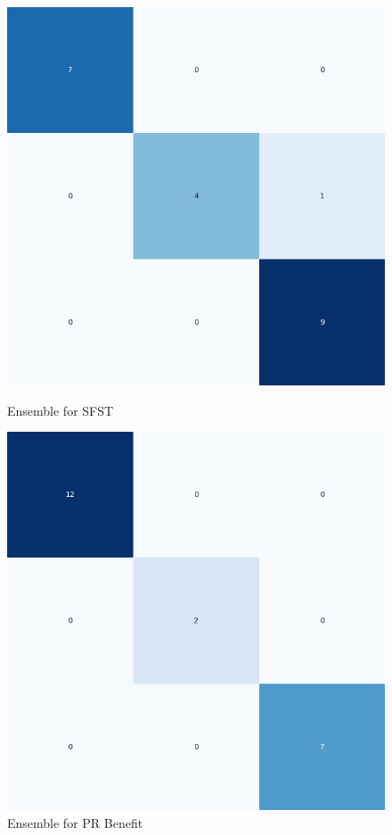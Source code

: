 \begin{figure}[H]
    \centering
    \begin{minipage}[b]{0.45\textwidth}
        \includegraphics[width=\textwidth]{./class_specific_section/ensemble_plots/ensemble_confusion_matrix_SFST.png}
        \caption{Ensemble for SFST}
        \label{fig_class:spec_ensemble_sfst}
    \end{minipage}
    \hfill
    \begin{minipage}[b]{0.45\textwidth}
        \includegraphics[width=\textwidth]{./class_specific_section/ensemble_plots/ensemble_confusion_matrix_PR_Benefit.png}
        \caption{Ensemble for PR Benefit}
        \label{fig_class:spec_ensemble_pr_benefit}
    \end{minipage}
\end{figure}

